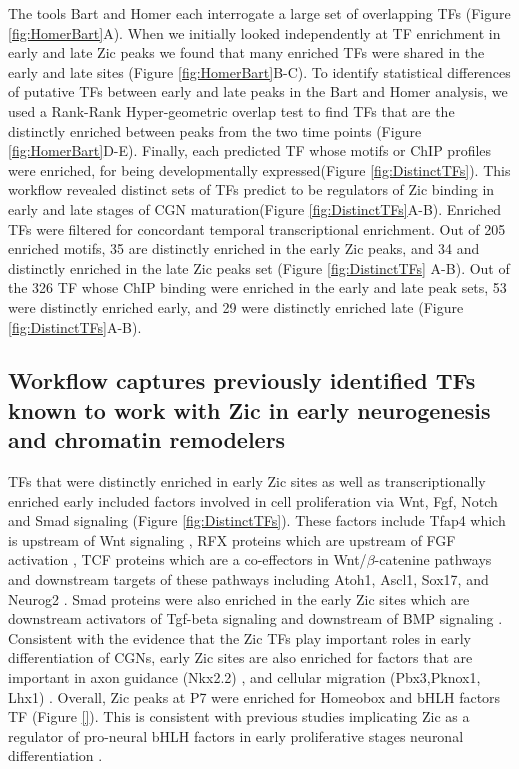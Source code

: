 \documentclass[fleqn,10pt]{wlscirep}
\begin{document}
The tools Bart and Homer each interrogate a large set of overlapping TFs (Figure \ref{fig:HomerBart}A). When we initially looked  independently at TF enrichment in early and late Zic peaks we found that many enriched TFs were shared in the early and late sites (Figure \ref{fig:HomerBart}B-C).  To identify statistical differences of putative TFs between early and late peaks in the Bart and Homer analysis, we used a Rank-Rank Hyper-geometric  overlap test to find TFs that are the distinctly enriched between peaks from the two time points (Figure \ref{fig:HomerBart}D-E). Finally, each predicted TF whose motifs or ChIP profiles were enriched, for being developmentally expressed(Figure \ref{fig:DistinctTFs}). This workflow revealed distinct sets of TFs predict to be regulators of Zic binding in early and late stages of CGN maturation(Figure \ref{fig:DistinctTFs}A-B). Enriched TFs were filtered for concordant temporal transcriptional enrichment. Out of 205 enriched motifs, 35 are distinctly enriched in the early Zic peaks, and 34 and distinctly enriched in the late Zic peaks set (Figure \ref{fig:DistinctTFs} A-B). Out of the 326 TF whose ChIP binding were enriched in the early and late peak sets, 53 were distinctly enriched early, and 29 were distinctly enriched late (Figure \ref{fig:DistinctTFs}A-B).  

\subsection*{Workflow captures previously identified TFs known to work with Zic in early neurogenesis and chromatin remodelers}
TFs that were distinctly enriched in early Zic sites as well as transcriptionally enriched early included factors involved in cell proliferation via Wnt, Fgf, Notch and Smad signaling (Figure \ref{fig:DistinctTFs}). These factors include Tfap4 which is upstream  of Wnt signaling \cite{Medina-Martinez2020TheDevelopment, Song2018TranscriptionCarcinoma}, RFX proteins which are upstream of FGF activation \cite{Hsu2012CiliogenicPromoter}, TCF proteins \cite{Shy2013RegulationSignaling} which are a co-effectors in  Wnt/$\beta$-catenine pathways and downstream targets of these pathways including  Atoh1, Ascl1, Sox17, and Neurog2 \cite{Dennis2019BHLHReprogramming, Zhu2019pBCL11ACancer/p, Lacomme2012NEUROG2Cycle, Katoh2018MultilayeredReview, Lebensohn2016ComparativeSignaling}. Smad proteins were also enriched in the early Zic sites which are downstream activators of Tgf-beta signaling and downstream of BMP signaling \cite{Liu2021SMAD4Pathways, Nickel2019SpecificationSignaling,Derynck2003Smad-dependentSignalling}. Consistent with the evidence that the Zic TFs play important roles in early differentiation of CGNs, early Zic sites are also enriched for factors that are important in axon guidance (Nkx2.2) \cite{}, and cellular migration (Pbx3,Pknox1, Lhx1) \cite{}. Overall, Zic peaks at P7 were enriched for Homeobox and bHLH factors TF (Figure \ref{}). This is consistent with previous studies implicating Zic as a regulator of pro-neural bHLH factors in early proliferative stages neuronal differentiation \cite{Aruga2018ZicDisease}.
\end{document}
